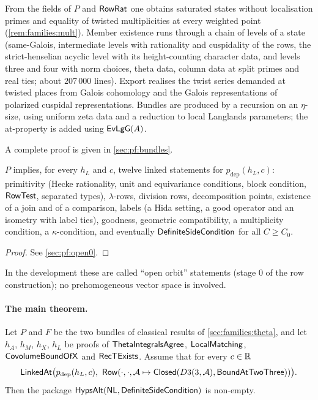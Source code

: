 \begin{proofoutline}
From the fields of $P$ and $\mathsf{RowRat}$ one obtains saturated states without localisation primes and equality
of twisted multiplicities at every weighted point (\cref{rem:families:mult}). Member existence runs through a
chain of levels of a state (same-Galois, intermediate levels with rationality and cuspidality of the rows, the
strict-henselian acyclic level with its height-counting character data, and levels three and four with norm
choices, theta data, column data at split primes and real ties; about $207\,000$ lines). Export realises the twist
series demanded at twisted places from Galois cohomology and the Galois representations of polarized cuspidal
representations. Bundles are produced by a recursion on an $\eta$-size, using uniform zeta data and a reduction to
local Langlands parameters; the at-property is added using $\mathsf{EvLgG}(A)$.

A complete proof is given in \cref{sec:pf:bundles}.
\end{proofoutline}

\begin{theorem}\Fmark\label{thm:families:open}
$P$ implies, for every $h_L$ and $c$, twelve linked statements for $p_{\mathrm{dep}}(h_L,c)$: primitivity (Hecke
rationality, unit and equivariance conditions, block condition, $\mathsf{RowTest}$, separated types),
$\lambda$-rows, division rows, decomposition points, existence of a join and of a comparison, labels (a Hida
setting, a good operator and an isometry with label ties), goodness, geometric compatibility, a multiplicity
condition, a $\kappa$-condition, and eventually $\mathsf{DefiniteSideCondition}$ for all $C\ge C_0$.
\end{theorem}
\begin{proof}See \cref{sec:pf:open0}.
\end{proof}


In the development these are called ``open orbit'' statements (stage $0$ of the row construction); no
prehomogeneous vector space is involved.

\paragraph{The main theorem.}
\begin{theorem}\Fmark\label{thm:hyps-nonempty}
Let $P$ and $F$ be the two bundles of classical results of \cref{sec:families:theta}, and let $h_A$, $h_M$,
$h_X$, $h_L$ be proofs of $\mathsf{ThetaIntegralsAgree}$, $\mathsf{LocalMatching}$, $\mathsf{CovolumeBoundOfX}$
and $\mathsf{RecTExists}$. Assume that for every $c\in\mathbb{R}$
\[
\familiesLinked\bigl(p_{\mathrm{dep}}(h_L,c),\ \familiesRow(\cdot,\cdot,\mathcal A\mapsto
\familiesClosed(D3(3,\mathcal A),\sfname{BoundAtTwoThree}))\bigr).
\]
Then the package $\mathsf{HypsAlt}(\mathsf{NL},\mathsf{DefiniteSideCondition})$ is non-empty.
\end{theorem}

